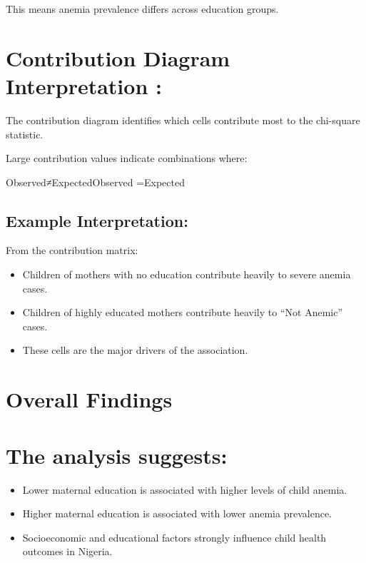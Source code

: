 \documentclass[
]{article}
\begin{document}
This means anemia prevalence differs across education groups.

\section{\texorpdfstring{\textbf{Contribution Diagram Interpretation
:}}{Contribution Diagram Interpretation :}}\label{contribution-diagram-interpretation}

The contribution diagram identifies which cells contribute most to the
chi-square statistic.

Large contribution values indicate combinations where:

Observed≠ExpectedObserved =Expected

\subsection{\texorpdfstring{\textbf{Example
Interpretation:}}{Example Interpretation:}}\label{example-interpretation}

From the contribution matrix:

\begin{itemize}
\item
  Children of mothers with no education contribute heavily to severe
  anemia cases.
\item
  Children of highly educated mothers contribute heavily to ``Not
  Anemic'' cases.
\item
  These cells are the major drivers of the association.
\end{itemize}

\section{Overall Findings}\label{overall-findings}

\section{The analysis suggests:}\label{the-analysis-suggests}

\begin{itemize}
\item
  Lower maternal education is associated with higher levels of child
  anemia.
\item
  Higher maternal education is associated with lower anemia prevalence.
\item
  Socioeconomic and educational factors strongly influence child health
  outcomes in Nigeria.
\end{itemize}
\end{document}
